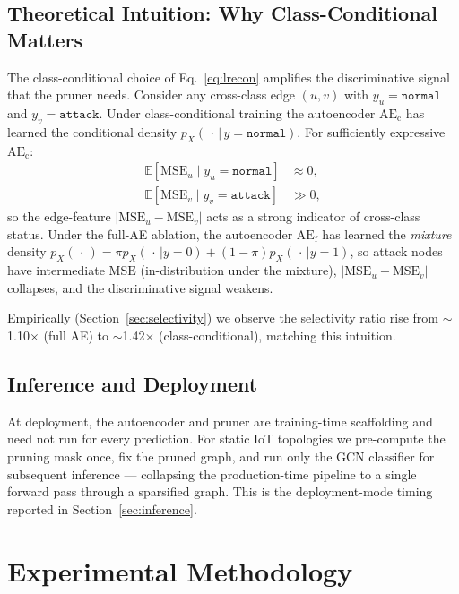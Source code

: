 \documentclass[11pt,a4paper]{report}
\theoremstyle{definition}
\theoremstyle{remark}
\begin{document}
\section{Theoretical Intuition: Why Class-Conditional Matters}

The class-conditional choice of Eq.~\eqref{eq:lrecon} amplifies the
discriminative signal that the pruner needs.
Consider any cross-class edge $(u,v)$ with $y_u=\texttt{normal}$ and
$y_v=\texttt{attack}$. Under class-conditional training the
autoencoder $\text{AE}_{\text{c}}$ has learned the conditional density
$p_X(\,\cdot\,|\,y=\texttt{normal})$. For sufficiently expressive
$\text{AE}_{\text{c}}$:
\begin{align*}
\mathbb{E}[\mathrm{MSE}_u\mid y_u=\texttt{normal}] &\approx 0, \\
\mathbb{E}[\mathrm{MSE}_v\mid y_v=\texttt{attack}] &\gg 0,
\end{align*}
so the edge-feature
$|\mathrm{MSE}_u-\mathrm{MSE}_v|$ acts as a strong indicator of
cross-class status. Under the full-AE ablation, the autoencoder
$\text{AE}_{\text{f}}$ has learned the \emph{mixture} density
$p_X(\,\cdot\,) = \pi p_X(\,\cdot\,|y=0) + (1-\pi) p_X(\,\cdot\,|y=1)$,
so attack nodes have intermediate $\mathrm{MSE}$ (in-distribution under
the mixture), $|\mathrm{MSE}_u-\mathrm{MSE}_v|$ collapses, and the
discriminative signal weakens.

Empirically (Section~\ref{sec:selectivity}) we observe the selectivity
ratio rise from $\sim$1.10$\times$ (full AE) to $\sim$1.42$\times$
(class-conditional), matching this intuition.

\section{Inference and Deployment}

At deployment, the autoencoder and pruner are training-time scaffolding
and need not run for every prediction. For static IoT topologies we
pre-compute the pruning mask once, fix the pruned graph, and run only
the GCN classifier for subsequent inference --- collapsing the
production-time pipeline to a single forward pass through a sparsified
graph. This is the deployment-mode timing reported in
Section~\ref{sec:inference}.

\chapter{Experimental Methodology}
\label{ch:experiments}
\end{document}
